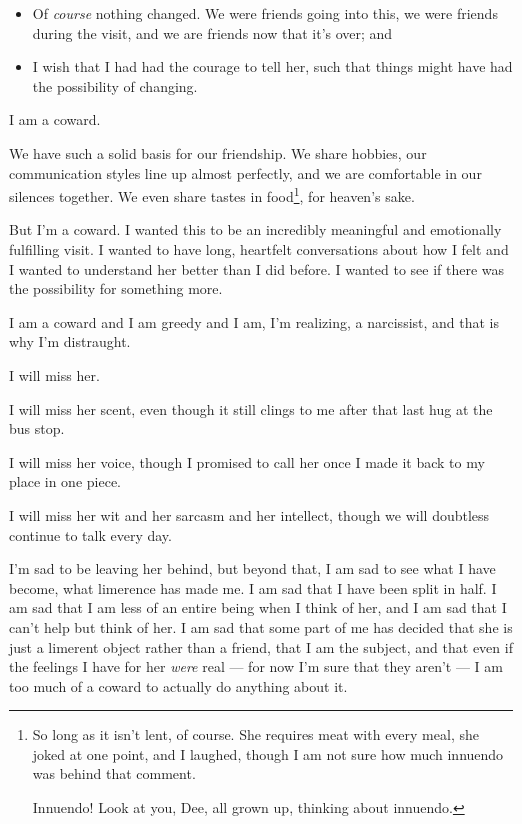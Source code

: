 \begin{itemize}
\tightlist
\item
  Of \emph{course} nothing changed. We were friends going into this, we were friends during the visit, and we are friends now that it's over; and
\item
  I wish that I had had the courage to tell her, such that things might have had the possibility of changing.
\end{itemize}

I am a coward.

We have such a solid basis for our friendship. We share hobbies, our communication styles line up almost perfectly, and we are comfortable in our silences together. We even share tastes in food\footnote{So long as it isn't lent, of course. She requires meat with every meal, she joked at one point, and I laughed, though I am not sure how much innuendo was behind that comment.

Innuendo! Look at you, Dee, all grown up, thinking about innuendo.}, for heaven's sake.

But I'm a coward. I wanted this to be an incredibly meaningful and emotionally fulfilling visit. I wanted to have long, heartfelt conversations about how I felt and I wanted to understand her better than I did before. I wanted to see if there was the possibility for something more.

I am a coward and I am greedy and I am, I'm realizing, a narcissist, and that is why I'm distraught.

I will miss her.

I will miss her scent, even though it still clings to me after that last hug at the bus stop.

I will miss her voice, though I promised to call her once I made it back to my place in one piece.

I will miss her wit and her sarcasm and her intellect, though we will doubtless continue to talk every day.

I'm sad to be leaving her behind, but beyond that, I am sad to see what I have become, what limerence has made me. I am sad that I have been split in half. I am sad that I am less of an entire being when I think of her, and I am sad that I can't help but think of her. I am sad that some part of me has decided that she is just a limerent object rather than a friend, that I am the subject, and that even if the feelings I have for her \emph{were} real --- for now I'm sure that they aren't --- I am too much of a coward to actually do anything about it.


